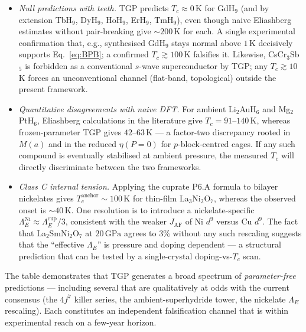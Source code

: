 \documentclass[11pt,a4paper]{article}
\newcommand{\GPa}{\,\mathrm{GPa}}
\newcommand{\LamE}{\Lambda_{E}}
\begin{document}
\begin{itemize}[leftmargin=1.2em]
\item \emph{Null predictions with teeth.}  TGP predicts
$T_{c}\!\approx\!0\,$K for GdH$_{9}$ (and by extension TbH$_{9}$,
DyH$_{9}$, HoH$_{9}$, ErH$_{9}$, TmH$_{9}$), even though naive Eliashberg
estimates without pair-breaking give $\sim\!200\,$K for each.  A single
experimental confirmation that, e.g., synthesised GdH$_{9}$ stays
normal above $1\,$K decisively supports
Eq.~\eqref{eq:BPB}; a confirmed $T_{c}\gtrsim 100\,$K falsifies it.
Likewise, CsCr$_{3}$Sb$_{5}$ is forbidden as a conventional $s$-wave
superconductor by TGP; any $T_{c}\gtrsim 10\,$K forces an
unconventional channel (flat-band, topological) outside the present
framework.

\item \emph{Quantitative disagreements with naive DFT.}  For ambient
Li$_{2}$AuH$_{6}$ and Mg$_{2}$PtH$_{6}$, Eliashberg calculations in the
literature give $T_{c}=91$--$140\,$K, whereas frozen-parameter TGP
gives $42$--$63\,$K --- a factor-two discrepancy rooted in $M(a)$ and
in the reduced $\eta(P\!=\!0)$ for $p$-block-centred cages.  If any
such compound is eventually stabilised at ambient pressure, the measured
$T_{c}$ will directly discriminate between the two frameworks.

\item \emph{Class C internal tension.}  Applying the cuprate P6.A
formula to bilayer nickelates gives $T_{c}^{\mathrm{anchor}}\sim 100\,$K
for thin-film La$_{3}$Ni$_{2}$O$_{7}$, whereas the observed onset is
$\sim\!40\,$K.  One resolution is to introduce a nickelate-specific
$\LamE^{\mathrm{Ni}}\approx \LamE^{\mathrm{cup}}/3$, consistent with
the weaker $J_{\mathrm{AF}}$ of Ni $d^{9}$ versus Cu $d^{9}$.  The fact
that La$_{2}$SmNi$_{2}$O$_{7}$ at $20\GPa$ agrees to $3\%$ without
any such rescaling suggests that the ``effective $\LamE$'' is pressure
and doping dependent --- a structural prediction that can be tested by
a single-crystal doping-vs-$T_{c}$ scan.
\end{itemize}

The table demonstrates that TGP generates a broad spectrum of
\emph{parameter-free} predictions --- including several that are
qualitatively at odds with the current consensus (the $4f^{7}$ killer
series, the ambient-superhydride tower, the nickelate $\LamE$
rescaling).  Each constitutes an independent falsification channel
that is within experimental reach on a few-year horizon.

\end{document}
